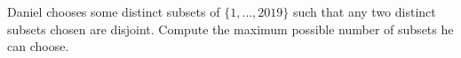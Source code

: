 Daniel chooses some distinct subsets of $\{1, \dots, 2019\}$ such that any two distinct subsets chosen are disjoint. Compute the maximum possible number of subsets he can choose.
